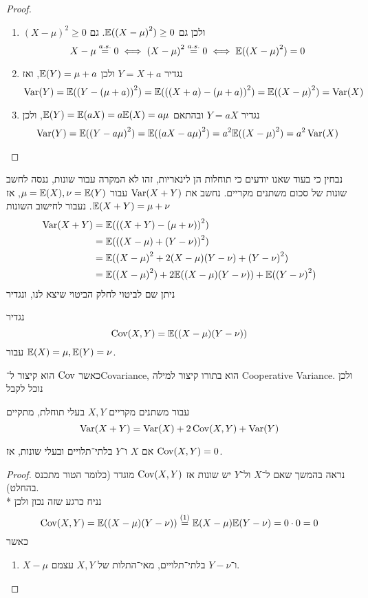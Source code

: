 \begin{proof}
	\begin{enumerate}
		\item ${(X - \mu)}^2 \ge 0$ ולכן גם $\mathbb{E}({(X - \mu)}^2) \ge 0$. גם
			\[
				X - \mu \overset{a.s.}{=} 0 \iff {(X - \mu)}^2 \overset{a.s.}{=} 0 \iff \mathbb{E}({(X - \mu)}^2) = 0
			\]
		\item נגדיר $Y = X + a$ ולכן $\mathbb{E}(Y) = \mu + a$, ואז
			\[
				\operatorname{Var}(Y) = \mathbb{E}({(Y - (\mu + a))}^2) = \mathbb{E}({((X + a) - (\mu + a))}^2) = \mathbb{E}({(X - \mu)}^2) = \operatorname{Var}(X)
			\]
		\item נגדיר $Y = aX$ ובהתאם $\mathbb{E}(Y) = \mathbb{E}(aX) = a \mathbb{E}(X) = a \mu$, ולכן
			\[
				\operatorname{Var}(Y) = \mathbb{E}({(Y - a \mu)}^2) = \mathbb{E}({(aX - a\mu)}^2) = a^2 \mathbb{E}({(X - \mu)}^2) = a^2 \operatorname{Var}(X)
			\]
	\end{enumerate}
\end{proof}
נבחין כי בעוד שאנו יודעים כי תוחלות הן לינאריות, זהו לא המקרה עבור שונות, ננסה לחשב שונות של סכום משתנים מקריים.
נחשב את $\operatorname{Var}(X + Y)$ עבור $\mu = \mathbb{E}(X), \nu = \mathbb{E}(Y)$, אז $\mathbb{E}(X + Y) = \mu + \nu$. נעבור לחישוב השונות
\begin{align*}
	\operatorname{Var}(X + Y)
	& = \mathbb{E}({((X + Y) - (\mu + \nu))}^2) \\
	& = \mathbb{E}({((X - \mu) + (Y - \nu))}^2) \\
	& = \mathbb{E}({(X - \mu)}^2 + 2 (X - \mu)(Y - \nu) + {(Y - \nu)}^2) \\
	& = \mathbb{E}({(X - \mu)}^2) + 2 \mathbb{E}((X - \mu)(Y - \nu)) + \mathbb{E}({(Y - \nu)}^2) \\
\end{align*}
ניתן שם לביטוי לחלק הביטוי שיצא לנו, ונגדיר
\begin{definition}
	נגדיר
	\[
		\operatorname{Cov}(X, Y) = \mathbb{E}((X - \mu)(Y - \nu))
	\]
	עבור $\mathbb{E}(X) = \mu, \mathbb{E}(Y) = \nu$.
\end{definition}
כאשר $\operatorname{Cov}$ הוא קיצור ל־Covariance, הוא בתורו קיצור למילה Cooperative Variance.
ולכן נוכל לקבל
\begin{conclusion}
	עבור משתנים מקריים $X, Y$ בעלי תוחלת, מתקיים
	\[
		\operatorname{Var}(X + Y) = \operatorname{Var}(X) + 2 \operatorname{Cov}(X, Y) + \operatorname{Var}(Y)
	\]
\end{conclusion}
\begin{proposition}
	אם $X$ ו־$Y$ בלתי־תלויים ובעלי שונות, אז $\operatorname{Cov}(X, Y) = 0$.
\end{proposition}
\begin{proof}
	נראה בהמשך שאם ל־$X$ ול־$Y$ יש שונות אז $\operatorname{Cov}(X, Y)$ מוגדר (כלומר הטור מתכנס בהחלט). \\*
	נניח כרגע שזה נכון ולכן
	\[
		\operatorname{Cov}(X, Y)
		= \mathbb{E}((X - \mu)(Y - \nu))
		\overset{(1)}{=} \mathbb{E}(X - \mu) \mathbb{E}(Y - \nu)
		= 0 \cdot 0
		= 0
	\]
	כאשר
	\begin{enumerate}
		\item $X - \mu$ ו־$Y - \nu$ בלתי־תלויים, מאי־התלות של $X, Y$ עצמם.
	\end{enumerate}
\end{proof}
